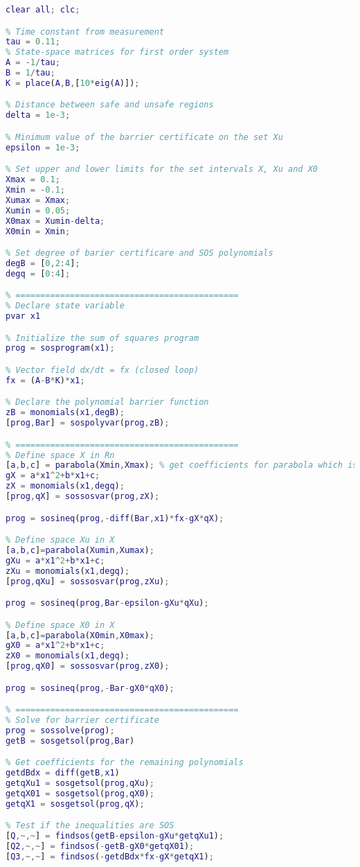 \begin{lstlisting}[language=matlab]
% 1D system WITHOUT REFERENCE
clear all; clc; 

% Time constant from measurement
tau = 0.11;
% State-space matrices for first order system
A = -1/tau;
B = 1/tau;
K = place(A,B,[10*eig(A)]);

% Distance between safe and unsafe regions
delta = 1e-3;

% Minimum value of the barrier certificate on the set Xu
epsilon = 1e-3;

% Set upper and lower limits for the set intervals X, Xu and X0
Xmax = 0.1;
Xmin = -0.1;
Xumax = Xmax;
Xumin = 0.05;
X0max = Xumin-delta;
X0min = Xmin;

% Set degree of barier certificare and SOS polynomials
degB = [0,2:4];
degq = [0:4];

% =============================================
% Declare state variable
pvar x1 

% Initialize the sum of squares program
prog = sosprogram(x1);

% Vector field dx/dt = fx (closed loop)
fx = (A-B*K)*x1;

% Declare the polynomial barrier function
zB = monomials(x1,degB);
[prog,Bar] = sospolyvar(prog,zB);

% =============================================
% Define space X in Rn
[a,b,c] = parabola(Xmin,Xmax); % get coefficients for parabola which is positive for x ? [-0.1,0.1]
gX = a*x1^2+b*x1+c;
zX = monomials(x1,degq);
[prog,qX] = sossosvar(prog,zX);

prog = sosineq(prog,-diff(Bar,x1)*fx-gX*qX);

% Define space Xu in X
[a,b,c]=parabola(Xumin,Xumax);
gXu = a*x1^2+b*x1+c;
zXu = monomials(x1,degq);
[prog,qXu] = sossosvar(prog,zXu);

prog = sosineq(prog,Bar-epsilon-gXu*qXu);

% Define space X0 in X
[a,b,c]=parabola(X0min,X0max);
gX0 = a*x1^2+b*x1+c;
zX0 = monomials(x1,degq);
[prog,qX0] = sossosvar(prog,zX0);

prog = sosineq(prog,-Bar-gX0*qX0);

% =============================================
% Solve for barrier certificate
prog = sossolve(prog);
getB = sosgetsol(prog,Bar)

% Get coefficients for the remaining polynomials
getdBdx = diff(getB,x1)
getqXu1 = sosgetsol(prog,qXu);
getqX01 = sosgetsol(prog,qX0);
getqX1 = sosgetsol(prog,qX);

% Test if the inequalities are SOS
[Q,~,~] = findsos(getB-epsilon-gXu*getqXu1);
[Q2,~,~] = findsos(-getB-gX0*getqX01);
[Q3,~,~] = findsos(-getdBdx*fx-gX*getqX1);
\end{lstlisting}


